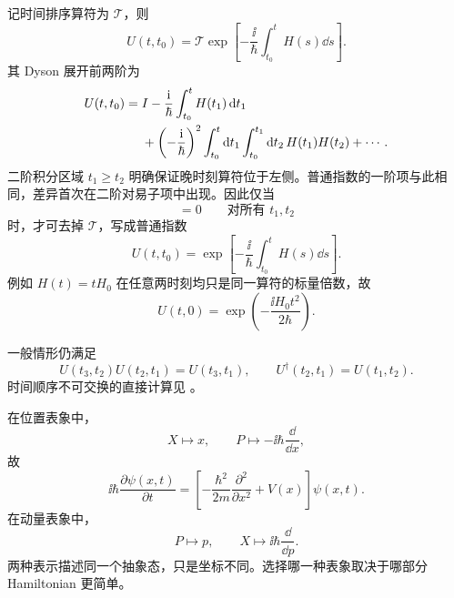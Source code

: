 记时间排序算符为 $\mathcal T$，则
\begin{equation}
  \boxed{U(t,t_0)
  =\mathcal T\exp\left[-\frac{\ii}{\hbar}
    \int_{t_0}^{t}H(s)\dd s\right]}.
  \label{eq:QM-C04-S03-time-ordered-exponential}
\end{equation}
其 Dyson 展开前两阶为
\begin{align}
  U(t,t_0)
  ={}&I-\frac{\mathrm{i}}{\hbar}\int_{t_0}^{t}H(t_1)\mathop{}\!\mathrm{d} t_1\notag\\
  &+\left(-\frac{\mathrm{i}}{\hbar}\right)^2
    \int_{t_0}^{t}\mathop{}\!\mathrm{d} t_1
    \int_{t_0}^{t_1}\mathop{}\!\mathrm{d} t_2\,
    H(t_1)H(t_2)+\cdots.
  \label{eq:QM-C04-S03-dyson-second-order}
\end{align}
二阶积分区域 $t_1\ge t_2$ 明确保证晚时刻算符位于左侧。普通指数的一阶项与此相同，差异首次在二阶对易子项中出现。因此仅当
\begin{equation}
  [H(t_1),H(t_2)]=0
  \qquad\text{对所有 }t_1,t_2
  \label{eq:QM-C04-S03-all-time-commutation}
\end{equation}
时，才可去掉 $\mathcal T$，写成普通指数
\begin{equation}
  U(t,t_0)=
  \exp\left[-\frac{\ii}{\hbar}
    \int_{t_0}^{t}H(s)\dd s\right].
  \label{eq:QM-C04-S03-ordinary-exponential-condition}
\end{equation}
例如 $H(t)=tH_0$ 在任意两时刻均只是同一算符的标量倍数，故
\begin{equation}
  U(t,0)=\exp\left(-\frac{\ii H_0t^2}{2\hbar}\right).
  \label{eq:QM-C04-S03-linear-time-hamiltonian}
\end{equation}

一般情形仍满足
\begin{equation}
  U(t_3,t_2)U(t_2,t_1)=U(t_3,t_1),
  \qquad
  U^\dagger(t_2,t_1)=U(t_1,t_2).
  \label{eq:QM-C04-S03-general-propagator-laws}
\end{equation}
时间顺序不可交换的直接计算见
。



在位置表象中，
\begin{equation}
  X\mapsto x,
  \qquad
  P\mapsto-\ii\hbar\frac{\dd}{\dd x},
  \label{eq:QM-C04-S03-position-representation}
\end{equation}
故
\begin{equation}
  \ii\hbar\frac{\partial\psi(x,t)}{\partial t}
  =\left[-\frac{\hbar^2}{2m}\frac{\partial^2}{\partial x^2}
    +V(x)\right]\psi(x,t).
  \label{eq:QM-C04-S03-position-schrodinger}
\end{equation}
在动量表象中，
\begin{equation}
  P\mapsto p,
  \qquad
  X\mapsto\ii\hbar\frac{\dd}{\dd p}.
  \label{eq:QM-C04-S03-momentum-representation}
\end{equation}
两种表示描述同一个抽象态，只是坐标不同。选择哪一种表象取决于哪部分 Hamiltonian 更简单。


